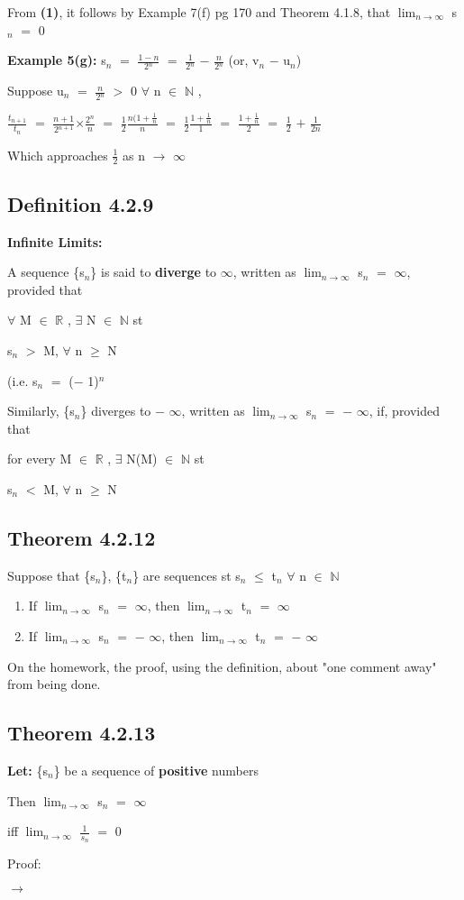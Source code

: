 \documentclass{article}
\newcommand{\mt}[1]{\ensuremath{#1}}
\newcommand\ssc[2][\DefaultOpt]{%
  \def\DefaultOpt{#2}%
  \subsection[#1]{#2}%
}
\newcommand{\balist}{\begin{enumerate}[label=\alph*.]}
\newcommand{\elist}{\end{enumerate}}
\newcommand{\lt}[1]{\textbf{Let: } #1}
\newcommand{\bpth}[1]{\textbf{(#1)}}
\newcommand{\br}{\mt{\mathbb{R}} }       %
\newcommand{\bn}{\mt{\mathbb{N}} }       %
\newcommand{\fa}{\mt{\forall} }          %
\newcommand{\mem}{\mt{\in} }
\newcommand{\exs}{\mt{\exists} }
\newcommand{\lra}{ \mt{\longrightarrow} } %
\newcommand{\bk}[1]{\{#1\}}
\newcommand{\ps}{\mt{+} }
\newcommand{\ms}{\mt{-} }
\newcommand{\ls}{\mt{<} }
\newcommand{\gr}{\mt{>} }
\newcommand{\lse}{\mt{\leq} }
\newcommand{\gre}{\mt{\geq} }
\newcommand{\eql}{\mt{=} }
\newcommand{\uw}[2]{#1\mt{_{#2}}}
\newcommand{\uf}[2]{#1\mt{^{#2}}}
\newcommand{\frc}[2]{\mt{\frac{#1}{#2}}}
\newcommand{\lmti}[1]{\mt{\displaystyle{\lim_{#1 \to \infty}}}}
\begin{document}
{From \bpth{1}, it follows by Example 7(f) pg 170 and Theorem 4.1.8, that \lmti{n} \uw{s}{n} \eql 0

\textbf{Example 5(g):} \uw{s}{n} \eql \frc{1 \ms n}{\uf{2}{n}} \eql \frc{1}{\uf{2}{n}} \ms \frc{n}{\uf{2}{n}} (or, \uw{v}{n} \ms \uw{u}{n})

Suppose \uw{u}{n} \eql \frc{n}{\uf{2}{n}} \gr 0 \fa n \mem \bn,

\frc{\uw{t}{n \ps 1}}{\uw{t}{n}} \eql \frc{n \ps 1}{\uf{2}{n \ps 1}}$\times$\frc{\uf{2}{n}}{n} \eql \frc{1}{2}\frc{n(1 \ps \frc{1}{n}}{n} \eql \frc{1}{2}\frc{1 \ps \frc{1}{n}}{1} \eql \frc{1 \ps \frc{1}{n}}{2} \eql \frc{1}{2} \ps \frc{1}{2n}

Which approaches \frc{1}{2} as n \lra $\infty$ \

\ssc{Definition 4.2.9}{

\textbf{Infinite Limits:}

A sequence \bk{\uw{s}{n}} is said to \textbf{diverge} to $\infty$, written as \lmti{n} \uw{s}{n} \eql $\infty$, provided that

\fa M \mem \br, \exs N \mem \bn st

\uw{s}{n} \gr M, \fa n \gre N

(i.e. \uw{s}{n} \eql (\ms1)$^n$

Similarly, \bk{\uw{s}{n}} diverges to \ms$\infty$, written as \lmti{n} \uw{s}{n} \eql \ms$\infty$, if, provided that

for every M \mem \br, \exs N(M) \mem \bn st

\uw{s}{n} \ls M, \fa n \gre N
}

\ssc{Theorem 4.2.12}{
Suppose that \bk{\uw{s}{n}}, \bk{\uw{t}{n}} are sequences st \uw{s}{n} \lse \uw{t}{n} \fa n \mem \bn 

\balist
\item If \lmti{n} \uw{s}{n} \eql $\infty$, then \lmti{n} \uw{t}{n} \eql $\infty$
\item If \lmti{n} \uw{s}{n} \eql \ms$\infty$, then \lmti{n} \uw{t}{n} \eql \ms$\infty$
\elist

On the homework, the proof, using the definition, about "one comment away" from being done.
}

\ssc{Theorem 4.2.13}{
\lt{\bk{\uw{s}{n}} be a sequence of \textbf{positive} numbers}

Then \lmti{n} \uw{s}{n} \eql $\infty$

iff \lmti{n} \frc{1}{\uw{s}{n}} \eql 0

Proof:

\lra

}}
\end{document}
